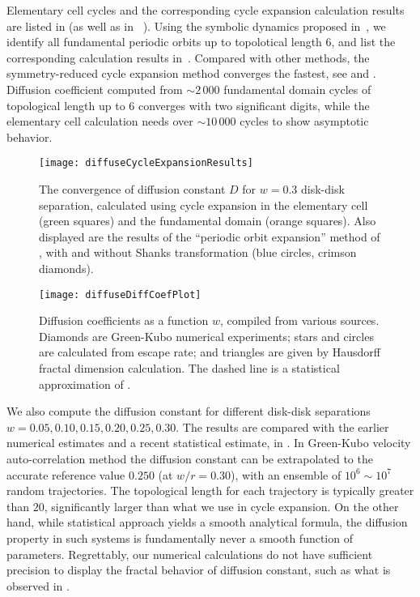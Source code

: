 Elementary cell cycles and the corresponding cycle expansion
calculation results are listed in  (as well as in
~\cite{CGS92}). Using the symbolic
dynamics proposed in~, we
identify all fundamental periodic orbits up to topolotical length 6,
and list the corresponding calculation results 
in~.
Compared with other methods, the symmetry-reduced cycle expansion
method converges
the fastest, see  and . Diffusion
coefficient computed from $\sim2\,000$ fundamental domain cycles of
topological length up to 6 converges with two significant digits,
while the elementary cell calculation needs over $\sim 10\,000$
cycles to show asymptotic behavior.

\begin{figure}
	\texttt{[image: diffuseCycleExpansionResults]}
	\caption{\label{fig-convergence}
The convergence of diffusion constant $D$  for  $w=0.3$
disk-disk separation, calculated using cycle expansion in the elementary cell
(green squares) and the fundamental domain (orange squares). Also displayed are
the results of the ``periodic orbit expansion'' method of , with and
without Shanks transformation (blue circles, crimson diamonds).
		}
\end{figure}

\begin{figure}
	\texttt{[image: diffuseDiffCoefPlot]}
	\caption[Diffusion coefficients computed using cycle expansion
	formulas]{\label{fig-results}
Diffusion coefficients as a function $w$, compiled from various sources. Diamonds
are Green-Kubo numerical experiments; stars and
circles are calculated from escape rate; and triangles are given by
Hausdorff fractal dimension calculation. The dashed line  is a
statistical approximation of .
    }
\end{figure}

We also compute the diffusion constant for different disk-disk separations
$w = 0.05, 0.10, 0.15, 0.20, 0.25, 0.30$.
The results are compared with the earlier numerical estimates and a recent
statistical estimate, in .
In Green-Kubo velocity auto-correlation method the  diffusion constant can be
extrapolated to the accurate reference value $0.250$ (at $w/r=0.30$), with an
ensemble of $10^6\sim10^7$ random trajectories.
The topological length for each trajectory is typically greater than $20$,
significantly larger than what we use in cycle expansion.
On the other hand, while statistical approach yields a smooth analytical
formula, the diffusion property in such systems is fundamentally
never a smooth function of parameters.
Regrettably, our numerical calculations do not have sufficient precision to
display the fractal behavior of diffusion constant, such as what is  observed in
.


